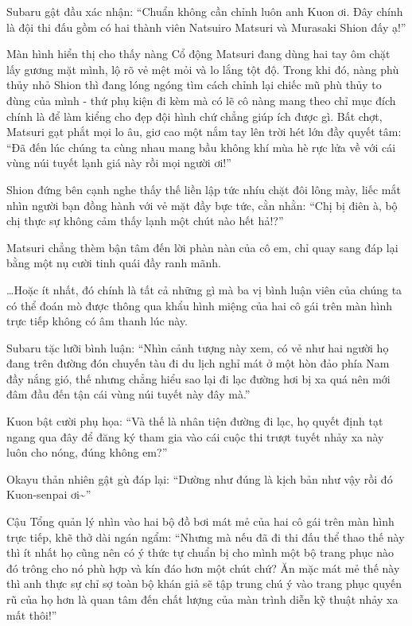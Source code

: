 \documentclass[../main.tex]{subfiles}
\begin{document}
Subaru gật đầu xác nhận: ``Chuẩn không cần chỉnh luôn anh Kuon ơi. Đây chính là đội thi đấu gồm có hai thành viên Natsuiro Matsuri và Murasaki Shion đấy ạ!''


Màn hình hiển thị cho thấy nàng Cổ động Matsuri đang dùng hai tay ôm chặt lấy gương mặt mình, lộ rõ vẻ mệt mỏi và lo lắng tột độ. Trong khi đó, nàng phù thủy nhỏ Shion thì đang lóng ngóng tìm cách chỉnh lại chiếc mũ phù thủy to đùng của mình - thứ phụ kiện đi kèm mà có lẽ cô nàng mang theo chỉ mục đích chính là để làm kiểng cho đẹp đội hình chứ chẳng giúp ích được gì. Bất chợt, Matsuri gạt phắt mọi lo âu, giơ cao một nắm tay lên trời hét lớn đầy quyết tâm: ``Đã đến lúc chúng ta cùng nhau mang bầu không khí mùa hè rực lửa về với cái vùng núi tuyết lạnh giá này rồi mọi người ơi!''

Shion đứng bên cạnh nghe thấy thế liền lập tức nhíu chặt đôi lông mày, liếc mắt nhìn người bạn đồng hành với vẻ mặt đầy bực tức, cằn nhằn: ``Chị bị điên à, bộ chị thực sự không cảm thấy lạnh một chút nào hết hả!?''

Matsuri chẳng thèm bận tâm đến lời phàn nàn của cô em, chỉ quay sang đáp lại bằng một nụ cười tinh quái đầy ranh mãnh.

\dots Hoặc ít nhất, đó chính là tất cả những gì mà ba vị bình luận viên của chúng ta có thể đoán mò được thông qua khẩu hình miệng của hai cô gái trên màn hình trực tiếp không có âm thanh lúc này.

Subaru tặc lưỡi bình luận: ``Nhìn cảnh tượng này xem, có vẻ như hai người họ đang trên đường đón chuyến tàu đi du lịch nghỉ mát ở một hòn đảo phía Nam đầy nắng gió, thế nhưng chẳng hiểu sao lại đi lạc đường hơi bị xa quá nên mới đâm đầu đến tận cái vùng núi tuyết này đây mà.''

Kuon bật cười phụ họa: ``Và thế là nhân tiện đường đi lạc, họ quyết định tạt ngang qua đây để đăng ký tham gia vào cái cuộc thi trượt tuyết nhảy xa này luôn cho nóng, đúng không em?''

Okayu thản nhiên gật gù đáp lại: ``Dường như đúng là kịch bản như vậy rồi đó Kuon-senpai ơi\~{}''

Cậu Tổng quản lý nhìn vào hai bộ đồ bơi mát mẻ của hai cô gái trên màn hình trực tiếp, khẽ thở dài ngán ngẩm: ``Nhưng mà nếu đã đi thi đấu thể thao thế này thì ít nhất họ cũng nên có ý thức tự chuẩn bị cho mình một bộ trang phục nào đó trông cho nó phù hợp và kín đáo hơn một chút chứ? Ăn mặc mát mẻ thế này thì anh thực sự chỉ sợ toàn bộ khán giả sẽ tập trung chú ý vào trang phục quyến rũ của họ hơn là quan tâm đến chất lượng của màn trình diễn kỹ thuật nhảy xa mất thôi!''
\end{document}
